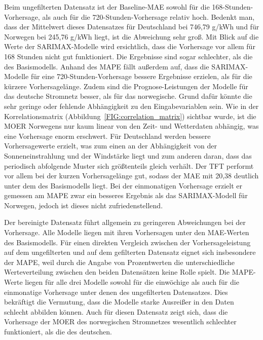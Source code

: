 Beim ungefilterten Datensatz ist der Baseline-\ac{MAE} sowohl für die 168-Stunden-Vorhersage, als auch für die 720-Stunden-Vorhersage relativ hoch.
Bedenkt man, dass der Mittelwert dieses Datensatzes für Deutschland bei 746,79 g/\ac{kWh} und für Norwegen bei 245,76 g/\ac{kWh} liegt, ist die Abweichung sehr groß.
Mit Blick auf die Werte der \ac{SARIMAX}-Modelle wird ersichtlich, dass die Vorhersage vor allem für 168 Stunden nicht gut funktioniert.
Die Ergebnisse sind sogar schlechter, als die des Basismodells.
Anhand des \ac{MAPE} fällt außerdem auf, dass die \ac{SARIMAX}-Modelle für eine 720-Stunden-Vorhersage bessere Ergebnisse erzielen, als für die kürzere Vorhersagelänge.
Zudem sind die Prognose-Leistungen der Modelle für das deutsche Stromnetz besser, als für das norwegische.
Grund dafür könnte die sehr geringe oder fehlende Abhängigkeit zu den Eingabevariablen sein.
Wie in der Korrelationsmatrix (Abbildung~\ref{FIG:correlation_matrix}) sichtbar wurde, ist die \ac{MOER} Norwegens nur kaum linear von den Zeit- und Wetterdaten abhängig, was eine Vorhersage enorm erschwert.
Für Deutschland werden bessere Vorhersagewerte erzielt, was zum einen an der Abhängigkeit von der Sonneneinstrahlung und der Windstärke liegt und zum anderen daran, dass das periodisch abfolgende Muster sich größtenteils gleich verhält.
Der \ac{TFT} performt vor allem bei der kurzen Vorhersagelänge gut, sodass der \ac{MAE} mit 20,38 deutlich unter dem des Basismodells liegt.
Bei der einmonatigen Vorhersage erzielt er gemessen am \ac{MAPE} zwar ein besseres Ergebnis als das \ac{SARIMAX}-Modell für Norwegen, jedoch ist dieses nicht zufriedenstellend.

Der bereinigte Datensatz führt allgemein zu geringeren Abweichungen bei der Vorhersage.
Alle Modelle liegen mit ihren Vorhersagen unter den \ac{MAE}-Werten des Basismodells.
Für einen direkten Vergleich zwischen der Vorhersageleistung auf dem ungefilterten und auf dem gefilterten Datensatz eignet sich insbesondere der \ac{MAPE}, weil durch die Angabe von Prozentwerten die unterschiedliche Werteverteilung zwischen den beiden Datensätzen keine Rolle spielt.
Die \ac{MAPE}-Werte liegen für alle drei Modelle sowohl für die einwöchige als auch für die einmonatige Vorhersage unter denen des ungefilterten Datensatzes.
Dies bekräftigt die Vermutung, dass die Modelle starke Ausreißer in den Daten schlecht abbilden können.
Auch für diesen Datensatz zeigt sich, dass die Vorhersage der \ac{MOER} des norwegischen Stromnetzes wesentlich schlechter funktioniert, als die des deutschen.

